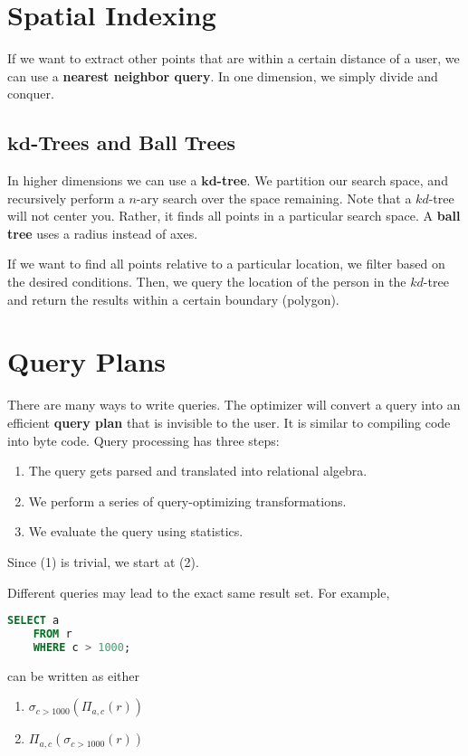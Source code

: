 \documentclass{report}
\newenvironment{example}{\begin{tcolorbox}[title={Example},colback=green!5!white,colframe=black!75!green]}{\end{tcolorbox}}
\renewcommand{\bf}[1]{\textbf{{#1}}}
\renewcommand{\it}[1]{\textit{{#1}}}
\begin{document}
\section{Spatial Indexing}
If we want to extract other points that are within a certain distance of a user,
we can use a \bf{nearest neighbor query}. In one dimension, we simply divide and
conquer.

\subsection[\it{kd}-Trees and Ball Trees]{$\bm{kd}$-Trees and Ball Trees}
In higher dimensions we can use a \bf{$\bm{kd}$-tree}. We partition our search
space, and recursively perform a $n$-ary search over the space remaining. Note
that a $kd$-tree will not center you. Rather, it finds all points in a
particular search space. A \bf{ball tree} uses a radius instead of axes.

\begin{example}
    If we want to find all points relative to a particular location, we filter
    based on the desired conditions. Then, we query the location of the person
    in the $kd$-tree and return the results within a certain boundary (polygon).
\end{example}

\section{Query Plans}
There are many ways to write queries. The optimizer will convert a query into an
efficient \bf{query plan} that is invisible to the user. It is similar to
compiling code into byte code. Query processing has three steps:
\begin{enumerate}[label=(\arabic*)]
    \item The query gets parsed and translated into relational algebra.
    \item We perform a series of query-optimizing transformations.
    \item We evaluate the query using statistics.
\end{enumerate}

Since (1) is trivial, we start at (2).
\begin{example}
    Different queries may lead to the exact same result set. For example,
\begin{lstlisting}[language=SQL, style=colorEX]
    SELECT a
    FROM r
    WHERE c > 1000;
\end{lstlisting}
can be written as either
\begin{enumerate}[label=(\arabic*)]
    \item $\sigma_{c > 1000}\left(\Pi_{a, c} \left(r\right)\right)$
    \item $\Pi_{a, c} \left(\sigma_{c > 1000}\left(r\right)\right)$
\end{enumerate}
\end{example}
\end{document}
